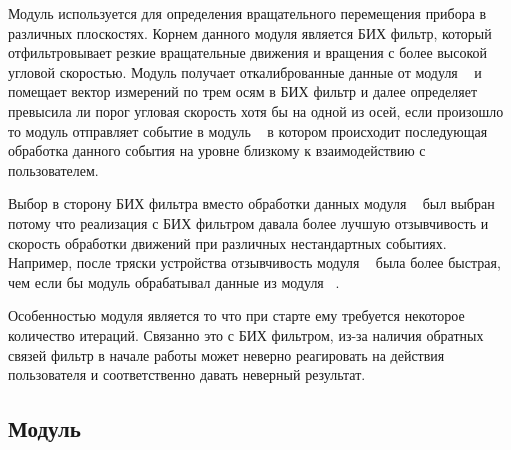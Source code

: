 Модуль используется для определения вращательного перемещения прибора в различных плоскостях. Корнем данного модуля является
БИХ фильтр, который отфильтровывает резкие вращательные движения и вращения с более высокой угловой скоростью.
Модуль получает откалиброванные данные от модуля \moduleCalib~ и помещает вектор измерений по трем осям в БИХ фильтр
и далее определяет превысила ли порог угловая скорость хотя бы на одной из осей, если произошло то модуль отправляет событие 
в модуль \moduleGraphics~ в котором происходит последующая обработка данного события на уровне близкому к взаимодействию с пользователем.

Выбор в сторону БИХ фильтра вместо обработки данных модуля \moduleOrientationAzimuth~ был выбран потому что реализация 
с БИХ фильтром давала более лучшую отзывчивость и скорость обработки движений при различных нестандартных событиях.
Например, после тряски устройства отзывчивость модуля \moduleMoveDetect~ была более быстрая, чем если бы модуль обрабатывал
данные из модуля \moduleOrientationAzimuth~. 

Особенностью модуля является то что при старте ему требуется некоторое количество итераций. Связанно это с БИХ фильтром, из-за наличия
обратных связей фильтр в начале работы может неверно реагировать на действия пользователя и соответственно давать неверный результат.

\subsection{Модуль \moduleOrientationAzimuth}


